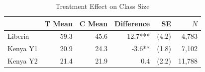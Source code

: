 \begin{table}[htbp]
\centering\small
\caption{Treatment Effect on Class Size}
\label{tab:classsize_effect}
\begin{tabular}{lrrrrr}
\toprule
 & T Mean & C Mean & Difference & SE & $N$ \\
\midrule
Liberia & 59.3 & 45.6 & 12.7*** & (4.2) & 4,783 \\
Kenya Y1 & 20.9 & 24.3 & -3.6** & (1.8) & 7,102 \\
Kenya Y2 & 21.4 & 21.9 & 0.4 & (2.2) & 11,788 \\
\bottomrule
\end{tabular}
\par\smallskip{}
\end{table}